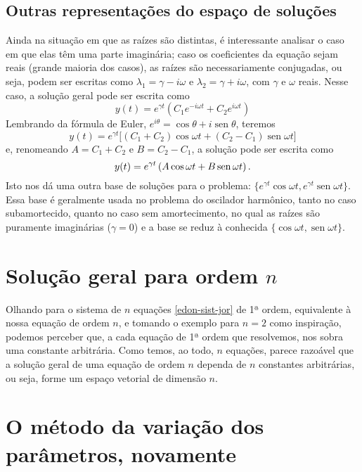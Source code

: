 \documentclass[12pt,a4paper,oneside]{memoir}
\DeclareMathOperator{\sen}{sen}
\begin{document}
\subsection*{Outras representações do espaço de soluções}

Ainda na situação em que as raízes são distintas, é interessante analisar o caso em que elas têm uma parte imaginária; caso os coeficientes da equação sejam reais (grande maioria dos casos), as raízes são necessariamente conjugadas, ou seja, podem ser escritas como $\lambda_1 = \gamma - i\omega$ e $\lambda_2 = \gamma + i\omega$, com $\gamma$ e $\omega$ reais.  Nesse caso, a solução geral pode ser escrita como
\[
  y(t) = e^{\gamma t} \left( C_1 e^{-i\omega t} + C_2 e^{i\omega t} \right)
\]
Lembrando da fórmula de Euler, $e^{i\theta} = \cos \theta + i \sen \theta$, teremos
\[
  y(t) = e^{\gamma t} \big[
    (C_1 + C_2) \cos \omega t +
    (C_2 - C_1) \sen \omega t \big]
\]
e, renomeando $A = C_1 + C_2$ e $B = C_2 - C_1$, a solução pode ser escrita como
\begin{equation}
\label{edo2-sol-dist-trig}
  y(t) = e^{\gamma t} \left( A \cos \omega t + B \sen \omega t \right)
  \text.
\end{equation}
Isto nos dá uma outra base de soluções para o problema: $\{e^{\gamma t} \cos \omega t, e^{\gamma t} \sen \omega t\}$.  Essa base é geralmente usada no problema do oscilador harmônico, tanto no caso subamortecido, quanto no caso sem amortecimento, no qual as raízes são puramente imaginárias ($\gamma = 0$) e a base se reduz à conhecida $\{\cos \omega t, \sen \omega t\}$.


\section{Solução geral para ordem $n$}

Olhando para o sistema de $n$ equações \eqref{edon-sist-jor} de 1ª ordem, equivalente à nossa equação de ordem $n$, e tomando o exemplo para $n = 2$ como inspiração, podemos perceber que, a cada equação de 1ª ordem que resolvemos, nos sobra uma constante arbitrária.  Como temos, ao todo, $n$ equações, parece razoável que a solução geral de uma equação de ordem $n$ dependa de $n$ constantes arbitrárias, ou seja, forme um espaço vetorial de dimensão $n$.


\section{O método da variação dos parâmetros, novamente}
\end{document}
